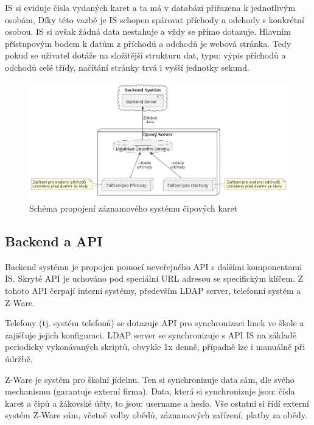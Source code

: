 \documentclass[FM,Proj]{tulthesis}
\begin{document}
IS si eviduje čísla vydaných karet a ta má v databázi přiřazena k jednotlivým osobám,
Díky této vazbě je IS schopen spárovat příchody a odchody s konkrétní osobou. IS si avšak žádná
data nestahuje a vždy se přímo dotazuje. Hlavním přístupovým bodem k datům z příchodů 
a odchodů je webová stránka. Tedy pokud se uživatel dotáže na složitější strukturu dat, typu:
výpis příchodů a odchodů celé třídy, načítání stránky trvá i vyšší jednotky sekund.

\begin{figure}[H]
    \includegraphics[width=\textwidth-28pt]{backend-cipovy-server.png}
    \caption{Schéma propojení záznamového systému čipových karet}
    \label{fig:backend-cipovy-server}
\end{figure}

\subsection{Backend a API}
\label{section:backend-a-api}
Backend systému je propojen pomocí neveřejného API s dalšími komponentami IS. Skryté API je 
uchováno pod speciální URL adresou se specifickým klíčem. Z tohoto API čerpají interní systémy,
především LDAP server, telefonní systém a Z-Ware.

Telefony (tj. systém telefonů) se dotazuje API pro synchronizaci linek ve škole a zajišťuje 
jejich konfiguraci. LDAP server se synchronizuje s API IS na základě periodicky vykonávaných
skriptů, obvykle 1x denně, případně lze i manuálně při údržbě.

Z-Ware je systém pro školní jídelnu. Ten si synchronizuje data sám, dle svého mechanismu
(garantuje externí firma). Data, která si synchronizuje jsou: čísla karet a čipů a žákovské 
účty, to jsou: username a heslo. Vše ostatní si řídí externí systém Z-Ware sám, včetně volby
obědů, záznamových zařízení, platby za obědy.
\end{document}
